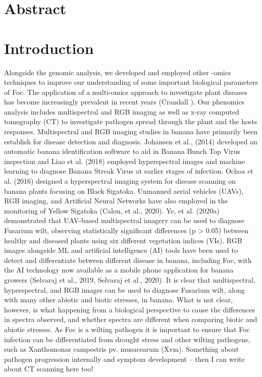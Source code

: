 \section{Abstract}

\newpage
\section{Introduction}
Alongside the genomic analysis, we developed and employed other -omics techniques to improve our understanding of some important biological parameters of Foc. The application of  a multi-omics approach to investigate plant diseases has become increasingly prevalent in recent years (Crandall ). Our phenomics analysis includes multispectral and RGB imaging as well as x-ray computed tomography (CT) to investigate pathogen spread through the plant and the hosts responses. 
Multispectral and RGB imaging studies in banana have primarily been establish for disease detection and diagnosis. Johansen et al., (2014) developed an automatic banana identification software to aid in Banana Bunch Top Virus inspection and Liao et al. (2018) employed hyperspectral images and machine learning to diagnose Banana Streak Virus at earlier stages of infection. Ochoa et al. (2016) designed a hyperspectral imaging system for disease scanning on banana plants focusing on Black Sigatoka. Unmanned aerial vehicles (UAVs), RGB imaging, and Artificial Neural Networks have also employed in the monitoring of Yellow Sigatoka (Calou, et al., 2020). Ye, et al. (2020a) demonstrated that UAV-based multispectral imagery can be used to diagnose Fusarium wilt, observing statistically significant differences (p > 0.05) between healthy and diseased plants using six different vegetation indices (VIs). RGB images alongside ML and artificial intelligence (AI) tools have been used to detect and differentiate between different disease in banana, including Foc, with the AI technology now available as a mobile phone application for banana growers (Selvaraj et al., 2019, Selvaraj et al., 2020).
It is clear that multispectral, hyperspectral, and RGB images can be used to diagnose Fusarium wilt, along with many other abiotic and biotic stresses, in banana. What is not clear, however, is what happening from a biological perspective to cause the differences in spectra observed, and whether spectra are different when comparing biotic and abiotic stresses. As Foc is a wilting pathogen it is important to ensure that Foc infection can be differentiated from drought stress and other wilting pathogens, such as Xanthomonas campestris pv. musacearum (Xvm). 
Something about pathogen progression internally and symptom development – then I can write about CT scanning here too!



